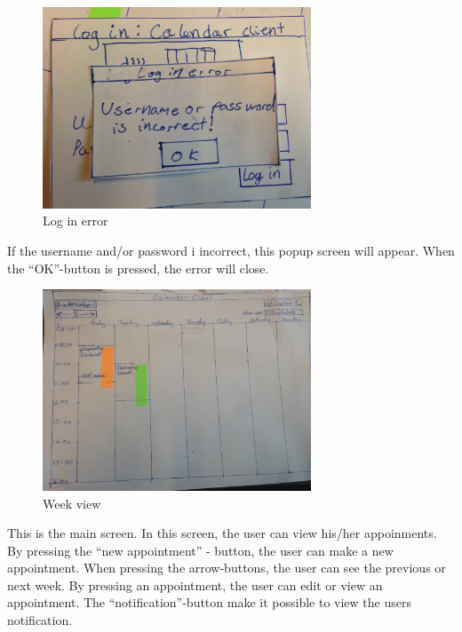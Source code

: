 \documentclass{article}
\begin{document}
\begin{figure}[h!] 
    \begin{center} 
        \includegraphics[width=8cm]{img/IMG_5612.JPG}
        \caption{Log in error}
    \label{loginerror}
    \end{center}
\end{figure}
If the username and/or password i incorrect, this popup screen will appear. When the ``OK''-button is pressed, the error will close.

\newpage

\begin{figure}[h!] 
    \begin{center} 
        \includegraphics[width=8cm]{img/IMG_5601.JPG}
        \caption{Week view}
    \label{weekview}
    \end{center}
\end{figure}

This is the main screen. In this screen, the user can view his/her appoinments. By pressing the ``new  appointment'' - button, the user can make a new appointment. When pressing the arrow-buttons, the user can see the previous or next week. By pressing an appointment, the user can edit or view an appointment. The ``notification''-button make it possible to view the users notification.
\end{document}
